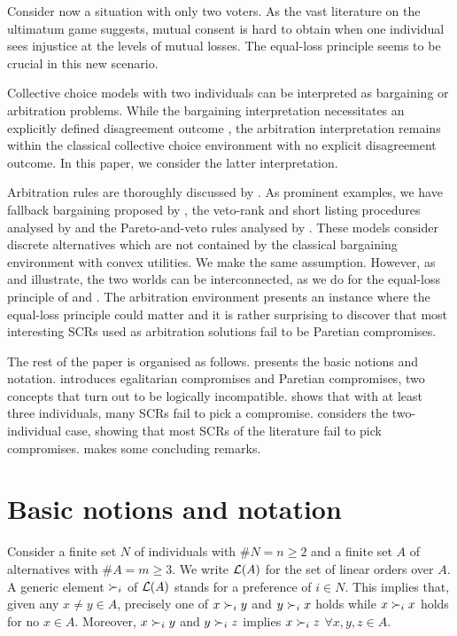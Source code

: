 Consider now a situation with only two voters. As the vast literature on the ultimatum game \citep{Werner2014} suggests, mutual consent is hard to obtain when one individual sees injustice at the levels of mutual losses. The equal-loss principle seems to be crucial in this new scenario.

Collective choice models with two individuals can be interpreted as bargaining or arbitration problems. While the bargaining interpretation necessitates an explicitly defined disagreement outcome \citep{Kibris2007}, the arbitration interpretation \citep{Sprumont1993} remains within the classical collective choice environment with no explicit disagreement outcome. In this paper, we consider the latter interpretation. 

Arbitration rules are thoroughly discussed by \citet{Barbera2020}. As prominent examples, we have fallback bargaining proposed by \citet{Brams2001}, the veto-rank and short listing procedures analysed by \citet{Clippel2014} and the Pareto-and-veto rules analysed by \citet{Laslier2020}. These models consider discrete alternatives which are not contained by the classical \citet{Nash1950} bargaining environment with convex utilities. We make the same assumption. However, as \citet{Mariotti1998} and \citet{Nagahisa2002} illustrate, the two worlds can be interconnected, as we do for the equal-loss principle of \citet{Chun1988} and \citet{Chun1991}. The arbitration environment presents an instance where the equal-loss principle could matter and it is rather surprising to discover that most interesting \acp{SCR} used as arbitration solutions fail to be Paretian compromises. 

The rest of the paper is organised as follows.  presents the basic notions and notation.  introduces egalitarian compromises and Paretian compromises, two concepts that turn out to be logically incompatible.  shows that with at least three individuals, many \acp{SCR} fail to pick a compromise.  considers the two-individual case, showing that most \acp{SCR} of the literature fail to pick compromises.  makes some concluding remarks. 

\section{Basic notions and notation}
\label{sec:notation}
Consider a finite set $N$ of individuals with $\#N=n\geq 2$ and a finite set $A$ of alternatives with $\#A=m\geq 3$. We write $\mathcal{L}(A)$ for the set of linear orders over $A$.
A generic element $\prefi$ of $\mathcal{L}(A)$ stands for a preference of $i\in N$. This implies that, given any $x ≠ y\in A$, precisely one of $x \prefi y$ and $y\prefi x$ holds while $x \prefi x$ holds for no $x\in A.$ Moreover, $x\prefi y$ and $y\prefi z$ implies $x\prefi z$ $\forall x,y,z\in A$.

